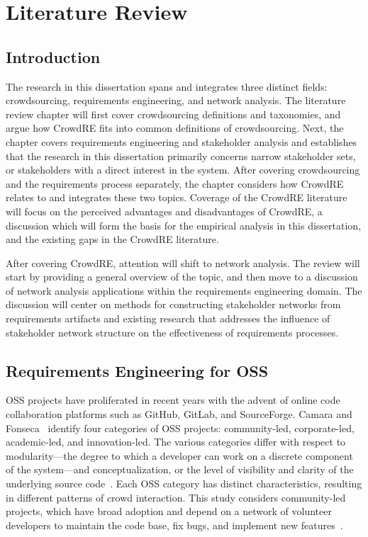 \doublespacing
\chapter{Literature Review} \label{chap:litreview}

\section{Introduction}

The research in this dissertation spans and integrates three distinct fields: crowdsourcing, requirements engineering, and network analysis. The literature review chapter will first cover crowdsourcing definitions and taxonomies, and argue how CrowdRE fits into common definitions of crowdsourcing. Next, the chapter covers requirements engineering and stakeholder analysis and establishes that the research in this dissertation primarily concerns narrow stakeholder sets, or stakeholders with a direct interest in the system. After covering crowdsourcing and the requirements process separately, the chapter considers how CrowdRE relates to and integrates these two topics. Coverage of the CrowdRE literature will focus on the perceived advantages and disadvantages of CrowdRE, a discussion which will form the basis for the empirical analysis in this dissertation, and the existing gaps in the CrowdRE literature.

After covering CrowdRE, attention will shift to network analysis. The review will start by providing a general overview of the topic, and then move to a discussion of network analysis applications within the requirements engineering domain. The discussion will center on methods for constructing stakeholder networks from requirements artifacts and existing research that addresses the influence of stakeholder network structure on the effectiveness of requirements processes.

\section{Requirements Engineering for OSS}
\label{oss_re}

OSS projects have proliferated in recent years with the advent of online code collaboration platforms such as GitHub, GitLab, and SourceForge. Camara and Fonseca~\cite{camara} identify four categories of OSS projects: community-led, corporate-led, academic-led, and innovation-led. The various categories differ with respect to modularity---the degree to which a developer can work on a discrete component of the system---and conceptualization, or the level of visibility and clarity of the underlying source code~\cite{camara}. Each OSS category has distinct characteristics, resulting in different patterns of crowd interaction. This study considers community-led projects, which have broad adoption and depend on a network of volunteer developers to maintain the code base, fix bugs, and implement new features~\cite{camara}. 

